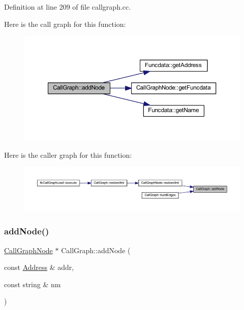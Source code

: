 Definition at line 209 of file callgraph.\+cc.

Here is the call graph for this function\+:
\nopagebreak
\begin{figure}[H]
\begin{center}
\leavevmode
\includegraphics[width=350pt]{class_call_graph_ae04a791d05bc2b05942e33ab58f01f45_cgraph}
\end{center}
\end{figure}
Here is the caller graph for this function\+:
\nopagebreak
\begin{figure}[H]
\begin{center}
\leavevmode
\includegraphics[width=350pt]{class_call_graph_ae04a791d05bc2b05942e33ab58f01f45_icgraph}
\end{center}
\end{figure}
\mbox{\label{class_call_graph_ae89cb838d6da0c1febdb1e52e38c1e35}} 
\subsubsection{\texorpdfstring{addNode()}{addNode()}\hspace{0.1cm}{\footnotesize\ttfamily [2/2]}}
{\footnotesize\ttfamily \mbox{\hyperlink{class_call_graph_node}{Call\+Graph\+Node}} $\ast$ Call\+Graph\+::add\+Node (\begin{DoxyParamCaption}\item[{const \mbox{\hyperlink{class_address}{Address}} \&}]{addr,  }\item[{const string \&}]{nm }\end{DoxyParamCaption})}



